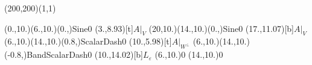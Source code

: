 \unitlength=1bp%

\begin{feynartspicture}(200,200)(1,1)

\FADiagram{}
\FAProp(0.,10.)(6.,10.)(0.,){Sine}{0}
\FALabel(3.,8.93)[t]{$A|_V$}
\FAProp(20,10.)(14.,10.)(0.,){Sine}{0}
\FALabel(17.,11.07)[b]{$A|_V$}
\FAProp(6.,10.)(14.,10.)(0.8,){ScalarDash}{0}
\FALabel(10.,5.98)[t]{$A|_{W^\perp}$}
\FAProp(6.,10.)(14.,10.)(-0.8,){BandScalarDash}{0}
\FALabel(10.,14.02)[b]{$L_\varepsilon$}
\FAVert(6.,10.){0}
\FAVert(14.,10.){0}
\end{feynartspicture}

